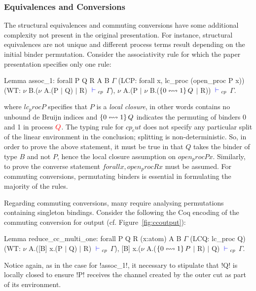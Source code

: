 \subsubsection{Equivalences and Conversions}

The structural equivalences and commuting conversions have some additional
complexity not present in the original presentation. For instance, structural
equivalences are not unique and different process terms result depending on
the initial binder permutation. Consider the associativity rule for which the
paper presentation specifies only one rule:
\begin{coq}
Lemma assoc_1:
  forall P Q R A B $\Gamma$
         (LCP: forall x, lc_proc (open_proc P x))
         (WT: $\nu$ B.($\nu$ A.(P $\mid$ Q) $\mid$ R) ${\color{blue} {} \vdash {}}_{cp}$ $\Gamma$),
    $\nu$ A.(P $\mid$ $\nu$ B.($\left\{{0}\leftrightsquigarrow{1}\right\}{Q}$ $\mid$ R)) ${\color{blue} {} \vdash {}}_{cp}$ $\Gamma$.
\end{coq}

where \coqe$lc_proc P$ specifies that \coqe$P$ is a \textit{local closure}, in
other words contains no unbound de Bruijn indices and $\left\{{0}\leftrightsquigarrow{1}\right\}Q$
indicates the permuting of binders 0 and 1 in process ${\color{red} Q}$. The typing
rule for \coqe$cp_cut$ does not specify any particular split of the linear
environment in the conclusion; splitting is non-deterministic. So, in order to
prove the above statement, it must be true in  that \coqe$Q$ takes the
binder of type \coqe$B$ and not \coqe$P$, hence the local closure assumption
on \coqe$open_proc P x$. Similarly, to prove the converse statement
\coqe$forall x, open_proc R x$ must be assumed. For commuting conversions,
permutating binders is essential in formulating the majority of the rules.



Regarding commuting conversions, many require analysing permutations
containing singleton bindings. Consider the following the Coq encoding of the
commuting conversion for output (cf. Figure~\ref{fig:ccoutput}):
\begin{coq}
Lemma reduce_cc_multi_one:
  forall P Q R (x:atom) A B $\Gamma$ (LCQ: lc_proc Q)
         (WT: $\nu$ A.([B] x.(P $\mid$ Q) $\mid$ R) ${\color{blue} {} \vdash {}}_{cp}$ $\Gamma$),
    [B] x.($\nu$ A.($\left\{{0}\leftrightsquigarrow{1}\right\}{P}$ $\mid$ R) $\mid$ Q) ${\color{blue} {} \vdash {}}_{cp}$ $\Gamma$.
\end{coq}

Notice again, as in the case for \coqe!assoc_1!, it necessary to stipulate
that \coqe!Q! is locally closed to ensure \coqe!P! receives the channel
created by the outer cut as part of its environment.

